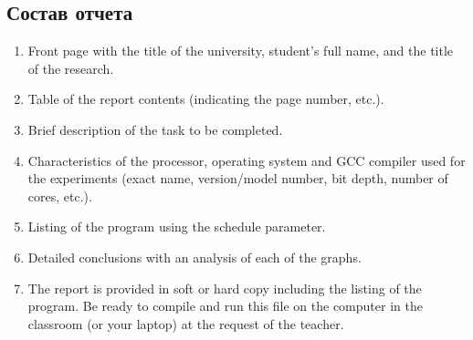 { %
	\subsection{Состав отчета}
	\begin{enumerate}
		\item Front page with the title of the university, student's full name, and the title of the research.
		\item Table of the report contents (indicating the page number, etc.).
		\item Brief description of the task to be completed.
		\item Characteristics of the processor, operating system and GCC compiler used for the experiments (exact name, version/model number, bit depth, number of cores, etc.).
		\item Listing of the program using the schedule parameter.
		\item Detailed conclusions with an analysis of each of the graphs.
		\item The report is provided in soft or hard copy including the listing of the program. Be ready to compile and run this file on the computer in the classroom (or your laptop) at the request of the teacher.
	\end{enumerate}
}